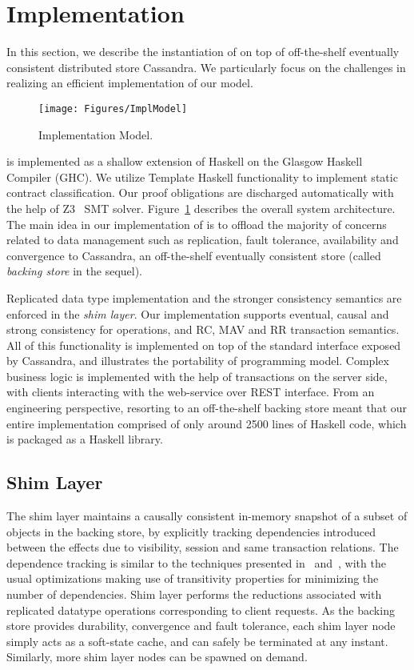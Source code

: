 \section{Implementation}

In this section, we describe the instantiation of \name on top of off-the-shelf
eventually consistent distributed store Cassandra. We particularly focus on the
challenges in realizing an efficient implementation of our model.

\begin{figure}
\begin{center}
\texttt{[image: Figures/ImplModel]}
\end{center}
\caption{Implementation Model.}
\label{fig:impl_mod}
\end{figure}

\name is implemented as a shallow extension of Haskell on the Glasgow Haskell
Compiler (GHC). We utilize Template Haskell functionality to implement static
contract classification. Our proof obligations are discharged automatically
with the help of Z3~\cite{} SMT solver. Figure~\ref{fig:impl_mod} describes the
overall system architecture. The main idea in our implementation of \name is to
offload the majority of concerns related to data management such as
replication, fault tolerance, availability and convergence to Cassandra, an
off-the-shelf eventually consistent store (called \emph{backing store} in the
sequel).

Replicated data type implementation and the stronger consistency semantics are
enforced in the \emph{shim layer}. Our implementation supports eventual, causal
and strong consistency for operations, and RC, MAV and RR transaction
semantics. All of this functionality is implemented on top of the standard
interface exposed by Cassandra, and illustrates the portability of \name
programming model. Complex business logic is implemented with the help of
transactions on the server side, with clients interacting with the web-service
over REST interface. From an engineering perspective, resorting to an
off-the-shelf backing store meant that our entire implementation comprised of
only around 2500 lines of Haskell code, which is packaged as a Haskell library.

\subsection{Shim Layer}

The shim layer maintains a causally consistent in-memory snapshot of a subset
of objects in the backing store, by explicitly tracking dependencies introduced
between the effects due to visibility, session and same transaction relations.
The dependence tracking is similar to the techniques presented in~\cite{BoltOn}
and~\cite{Eiger}, with the usual optimizations making use of transitivity
properties for minimizing the number of dependencies. Shim layer performs the
reductions associated with replicated datatype operations corresponding to
client requests. As the backing store provides durability, convergence and
fault tolerance, each shim layer node simply acts as a soft-state cache, and
can safely be terminated at any instant. Similarly, more shim layer nodes can
be spawned on demand.

